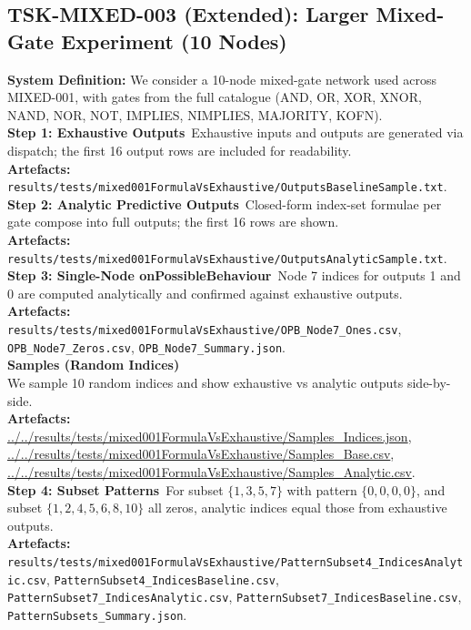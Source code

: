 \documentclass[11pt]{article}
\begin{document}
\subsection{TSK-MIXED-003 (Extended): Larger Mixed-Gate Experiment (10 Nodes)}
\textbf{System Definition:} We consider a 10-node mixed-gate network used across MIXED-001, with gates from the full catalogue (AND, OR, XOR, XNOR, NAND, NOR, NOT, IMPLIES, NIMPLIES, MAJORITY, KOFN).\\
\textbf{Step 1: Exhaustive Outputs}\
Exhaustive inputs and outputs are generated via dispatch; the first 16 output rows are included for readability.\\
\textbf{Artefacts:} \texttt{results/tests/mixed001FormulaVsExhaustive/OutputsBaselineSample.txt}.\\

\textbf{Step 2: Analytic Predictive Outputs}\
Closed-form index-set formulae per gate compose into full outputs; the first 16 rows are shown.\\
\textbf{Artefacts:} \texttt{results/tests/mixed001FormulaVsExhaustive/OutputsAnalyticSample.txt}.\\

\textbf{Step 3: Single-Node onPossibleBehaviour}\
Node 7 indices for outputs 1 and 0 are computed analytically and confirmed against exhaustive outputs.\\
\textbf{Artefacts:} \texttt{results/tests/mixed001FormulaVsExhaustive/OPB\_Node7\_Ones.csv}, \texttt{OPB\_Node7\_Zeros.csv}, \texttt{OPB\_Node7\_Summary.json}.\\
\textbf{Samples (Random Indices)}\\ We sample 10 random indices and show exhaustive vs analytic outputs side-by-side.\\
\textbf{Artefacts:} \url{../../results/tests/mixed001FormulaVsExhaustive/Samples_Indices.json}, \url{../../results/tests/mixed001FormulaVsExhaustive/Samples_Base.csv}, \url{../../results/tests/mixed001FormulaVsExhaustive/Samples_Analytic.csv}.\\
\textbf{Step 4: Subset Patterns}\
For subset \(\{1,3,5,7\}\) with pattern \(\{0,0,0,0\}\), and subset \(\{1,2,4,5,6,8,10\}\) all zeros, analytic indices equal those from exhaustive outputs.\\
\textbf{Artefacts:} \texttt{results/tests/mixed001FormulaVsExhaustive/PatternSubset4\_IndicesAnalytic.csv}, \texttt{PatternSubset4\_IndicesBaseline.csv}, \texttt{PatternSubset7\_IndicesAnalytic.csv}, \texttt{PatternSubset7\_IndicesBaseline.csv}, \texttt{PatternSubsets\_Summary.json}.\\
\end{document}
